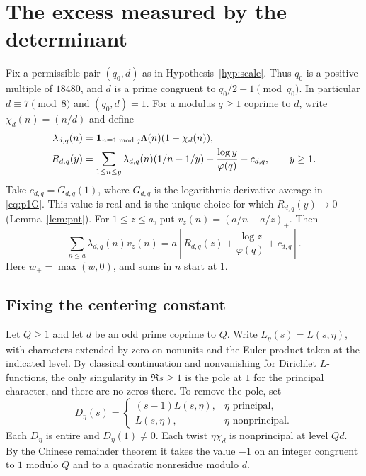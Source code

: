 \section{The excess measured by the determinant}\label{sec:excess}
Fix a permissible pair $(q_0,d)$ as in Hypothesis~\ref{hyp:scale}. Thus $q_0$ is a positive multiple of $18480$, and $d$ is a prime congruent to $q_0/2-1\pmod {q_0}$. In particular $d\equiv7\pmod 8$ and $(q_0,d)=1$.
For a modulus $q\ge1$ coprime to $d$, write $\chi_d(n)=(n/d)$ and define
\begin{align}
 \lambda_{d,q}(n)&=\mathbf 1_{n\equiv1\bmod q}\Lambda(n)(1-\chi_d(n)),\notag\\
 R_{d,q}(y)&=\sum_{1\le n\le y}\lambda_{d,q}(n)(1/n-1/y)
             -\frac{\log y}{\varphi(q)}-c_{d,q},\qquad y\ge1.\label{eq:R}
\end{align}
Take $c_{d,q}=G_{d,q}(1)$, where $G_{d,q}$ is the logarithmic derivative average in \eqref{eq:p1G}. This value is real and is the unique choice for which $R_{d,q}(y)\to0$ (Lemma~\ref{lem:pnt}). For $1\le z\le a$, put $v_z(n)=(a/n-a/z)_+$. Then
\begin{equation}
 \sum_{n\le a}\lambda_{d,q}(n)v_z(n)
 =a\left[R_{d,q}(z)+\frac{\log z}{\varphi(q)}+c_{d,q}\right].
 \label{eq:scaled}
\end{equation}
Here $w_+=\max(w,0)$, and sums in $n$ start at $1$.

\subsection{Fixing the centering constant}
Let $Q\ge1$ and let $d$ be an odd prime coprime to $Q$. Write $L_\eta(s)=L(s,\eta)$, with characters extended by zero on nonunits and the Euler product taken at the indicated level. By classical continuation and nonvanishing for Dirichlet $L$-functions, the only singularity in $\Re s\ge1$ is the pole at $1$ for the principal character, and there are no zeros there. To remove the pole, set
\[
 D_\eta(s)=
 \begin{cases}
 (s-1)L(s,\eta),&\eta\text{ principal},\\
 L(s,\eta),&\eta\text{ nonprincipal}.
 \end{cases}
\]
Each $D_\eta$ is entire and $D_\eta(1)\ne0$. Each twist $\eta\chi_d$ is nonprincipal at level $Qd$. By the Chinese remainder theorem it takes the value $-1$ on an integer congruent to $1$ modulo $Q$ and to a quadratic nonresidue modulo $d$.


